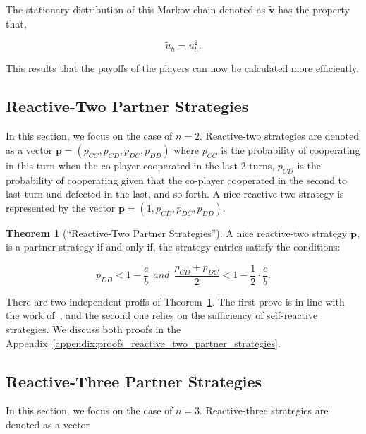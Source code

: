 \documentclass{article}
\theoremstyle{definition}
\newtheorem{theorem}{Theorem}[section]
\begin{document}
The stationary distribution of this Markov chain denoted as $\mathbf{\tilde{v}}$
has the property that,

$$
\tilde{u}_h = u^2_{h}.
$$

This results that the payoffs of the players can now be calculated more
efficiently.



\subsection{Reactive-Two Partner Strategies}\label{section:reactive_two_partner_strategies}

In this section, we focus on the case of $n=2$. Reactive-two strategies are denoted as a vector
$\mathbf{p}=(p_{CC}, p_{CD}, p_{DC}, p_{DD})$ where $p_{CC}$ is the
probability of cooperating in this turn when the co-player cooperated in the
last 2 turns, $p_{CD}$ is the probability of cooperating given that the
co-player cooperated in the second to last turn and defected in the last, and so
forth. A nice reactive-two strategy is represented by the vector $\mathbf{p}=(1,
p_{CD}, p_{DC}, p_{DD})$.

\begin{theorem}[``Reactive-Two Partner Strategies'']\label{theorem:reactive_two_partner_strategies}
A nice reactive-two strategy $\mathbf{p}$, is a partner strategy if and only if,
the strategy entries satisfy the conditions:

\begin{equation}\label{eq:two_bit_conditions}
  \displaystyle p_{DD} < 1\!-\! \frac{c}{b}  ~~and~~ \displaystyle \frac{p_{CD} + p_{DC}}{2} < 1- \frac{1}{2} \cdot \frac{c}{b}.
\end{equation}
\end{theorem}

There are two independent proffs of
Theorem~\ref{theorem:reactive_two_partner_strategies}. The first prove is
in line with the work of~\citep{akin:EGADS:2016}, and the second one relies on
the sufficiency of self-reactive strategies. We discuss both proofs
in the Appendix~\ref{appendix:proofs_reactive_two_partner_strategies}.

\subsection{Reactive-Three Partner Strategies}\label{section:reactive_three_partner_strategies}

In this section, we focus on the case of $n=3$. Reactive-three strategies are
denoted as a vector 
\end{document}
